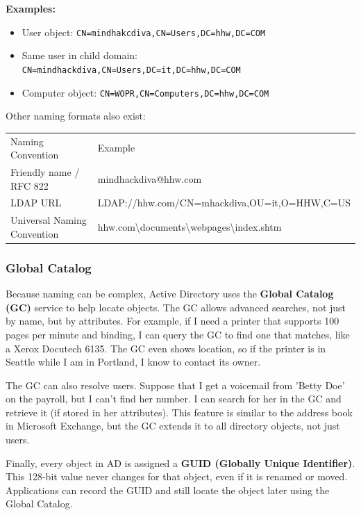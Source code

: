 \textbf{Examples:}
\begin{itemize}
    \item User object: \verb|CN=mindhakcdiva,CN=Users,DC=hhw,DC=COM|
    \item Same user in child domain: \verb|CN=mindhackdiva,CN=Users,DC=it,DC=hhw,DC=COM|
    \item Computer object: \verb|CN=WOPR,CN=Computers,DC=hhw,DC=COM|
\end{itemize}
Other naming formats also exist:
\begin{table}
\centering

\begin{tabular}{l l}
Naming Convention & Example \\

Friendly name / RFC 822 & mindhackdiva@hhw.com\\
LDAP URL & LDAP://hhw.com/CN=mhackdiva,OU=it,O=HHW,C=US\\
Universal Naming Convention & hhw.com\textbackslash{}documents\textbackslash{}webpages\textbackslash{}index.shtm\\

\end{tabular}

\end{table}

\subsubsection{Global Catalog}

Because naming can be complex, Active Directory uses the \textbf{Global Catalog (GC)} service to help locate objects. The GC allows advanced searches, not just by name, but by attributes. For example, if I need a printer that supports 100 pages per minute and binding, I can query the GC to find one that matches, like a Xerox Docutech 6135. The GC even shows location, so if the printer is in Seattle while I am in Portland, I know to contact its owner.

The GC can also resolve users. Suppose that I get a voicemail from 'Betty Doe' on the payroll, but I can't find her number. I can search for her in the GC and retrieve it (if stored in her attributes). This feature is similar to the address book in Microsoft Exchange, but the GC extends it to all directory objects, not just users.

Finally, every object in AD is assigned a \textbf{GUID (Globally Unique Identifier)}. This 128-bit value never changes for that object, even if it is renamed or moved. Applications can record the GUID and still locate the object later using the Global Catalog.











